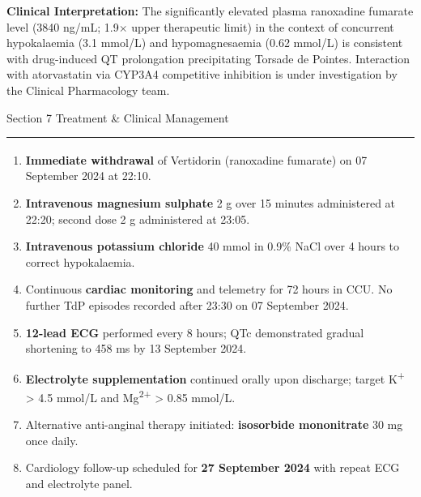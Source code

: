 \documentclass[11pt,a4paper]{scrartcl}
\newcommand{\sectionrule}{%
  \vspace{1pt}%
  {\color{WarmGold}\rule{\linewidth}{1.5pt}}%
  \vspace{4pt}%
}
\begin{document}
\vspace{4mm}

\begin{notebox}
\footnotesize \faInfoCircle\quad \textbf{Clinical Interpretation:} The significantly elevated plasma ranoxadine fumarate level (3840 ng/mL; 1.9\(\times\) upper therapeutic limit) in the context of concurrent hypokalaemia (3.1 mmol/L) and hypomagnesaemia (0.62 mmol/L) is consistent with drug-induced QT prolongation precipitating Torsade de Pointes. Interaction with atorvastatin via CYP3A4 competitive inhibition is under investigation by the Clinical Pharmacology team.
\end{notebox}

\vspace{6mm}

\begin{sectionbox}{\faHospital\quad Section 7 \textbar{} Treatment \& Clinical Management}
\end{sectionbox}
\sectionrule

\begin{enumerate}[leftmargin=*, label=\textbf{\arabic{*}.}, itemsep=3pt, parsep=0pt]
  \item \textbf{Immediate withdrawal} of Vertidorin\textsuperscript{\textregistered} (ranoxadine fumarate) on 07 September 2024 at 22:10.
  \item \textbf{Intravenous magnesium sulphate} 2 g over 15 minutes administered at 22:20; second dose 2 g administered at 23:05.
  \item \textbf{Intravenous potassium chloride} 40 mmol in 0.9\% NaCl over 4 hours to correct hypokalaemia.
  \item Continuous \textbf{cardiac monitoring} and telemetry for 72 hours in CCU. No further TdP episodes recorded after 23:30 on 07 September 2024.
  \item \textbf{12-lead ECG} performed every 8 hours; QTc demonstrated gradual shortening to 458 ms by 13 September 2024.
  \item \textbf{Electrolyte supplementation} continued orally upon discharge; target K\textsuperscript{+} {>} 4.5 mmol/L and Mg\textsuperscript{2+} {>} 0.85 mmol/L.
  \item Alternative anti-anginal therapy initiated: \textbf{isosorbide mononitrate} 30 mg once daily.
  \item Cardiology follow-up scheduled for \textbf{27 September 2024} with repeat ECG and electrolyte panel.
\end{enumerate}
\end{document}
